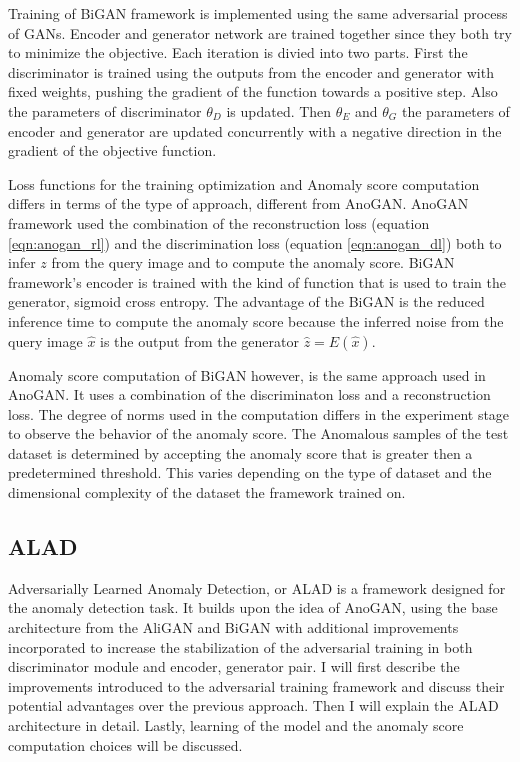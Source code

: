 Training of BiGAN framework is implemented using the same adversarial process of GANs. Encoder and
generator network are trained together since they both try to minimize the objective. Each iteration
is divied into two parts. First the discriminator is trained using the outputs from the encoder and
generator with fixed weights, pushing the gradient of the function towards a positive step. Also the
parameters of discriminator $\theta_D$ is updated. Then $\theta_E$ and $\theta_G$ the parameters of
encoder and generator are updated concurrently with a negative direction in the gradient of the
objective function. \cite{Donahue2017AdversarialFL}

Loss functions for the training optimization and Anomaly score computation differs in terms of the
type of approach, different from AnoGAN\cite{Schlegl2017UnsupervisedAD}. AnoGAN framework used the
combination of the reconstruction loss (equation \ref{eqn:anogan_rl}) and the discrimination loss
(equation \ref{eqn:anogan_dl}) both to infer $z$ from the query image and to compute the anomaly
score. BiGAN framework's encoder is trained with the kind of function that is used to train the
generator, sigmoid cross entropy. The advantage of the BiGAN is the reduced inference time to
compute the anomaly score because the inferred noise from the query image $\hat{x}$ is the output
from the generator $\hat{z} = E(\hat{x})$. 

Anomaly score computation of BiGAN however, is the same approach used in AnoGAN. It uses a
combination of the discriminaton loss and a reconstruction loss. The degree of norms used in the
computation differs in the experiment stage to observe the behavior of the anomaly score. The
Anomalous samples of the test dataset is determined by accepting the anomaly score that is greater
then a predetermined threshold. This varies depending on the type of dataset and the dimensional
complexity of the dataset the framework trained on.


\subsection{ALAD}
\label{sec:alad}

Adversarially Learned Anomaly Detection, or ALAD \cite{DBLP:journals/corr/abs-1812-02288} is a
framework designed for the anomaly detection task. It builds upon the idea of AnoGAN, using the base
architecture from the AliGAN and BiGAN with additional improvements incorporated to increase the
stabilization of the adversarial training in both  discriminator module and encoder, generator pair.
I will first describe the improvements introduced to the adversarial training framework and discuss
their potential advantages over the previous approach. Then I will explain the ALAD architecture in
detail. Lastly, learning of the model and the anomaly score computation choices will be discussed. 

